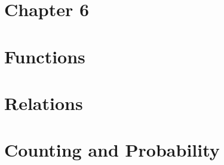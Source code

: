 \documentclass[12pt, letterpaper]{article}
\begin{document}
\section{Chapter 6}

\pagebreak

\section{Functions}




\pagebreak

\section{Relations}

\pagebreak

\section{Counting and Probability}





\end{document}

